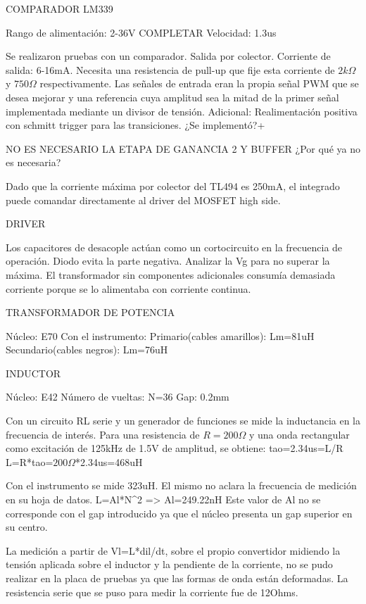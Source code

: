 COMPARADOR LM339

Rango de alimentación: 2-36V
COMPLETAR
Velocidad: 1.3us

Se realizaron pruebas con un comparador. 
Salida por colector. Corriente de salida: 6-16mA. Necesita una resistencia de pull-up que fije esta corriente de $2k\Omega$ y $750\Omega$ respectivamente. 
Las señales de entrada eran la propia señal PWM que se desea mejorar y una referencia cuya amplitud 
sea la mitad de la primer señal implementada mediante un divisor de tensión. 
Adicional: Realimentación positiva con schmitt trigger para las transiciones. ¿Se implementó?+

NO ES NECESARIO LA ETAPA DE GANANCIA 2 Y BUFFER ¿Por qué ya no es necesaria?

Dado que la corriente máxima por colector del TL494 es 250mA, el integrado puede comandar directamente al driver del MOSFET high side. 

DRIVER

Los capacitores de desacople actúan como un cortocircuito en la frecuencia de operación. 
Diodo evita la parte negativa. 
Analizar la Vg para no superar la máxima. 
El transformador sin componentes adicionales consumía demasiada corriente porque se lo alimentaba con corriente continua. 

TRANSFORMADOR DE POTENCIA

Núcleo: E70
Con el instrumento:
Primario(cables amarillos): Lm=81uH
Secundario(cables negros): Lm=76uH

INDUCTOR

Núcleo: E42
Número de vueltas: N=36
Gap: 0.2mm

Con un circuito RL serie y un generador de funciones se mide la inductancia en la frecuencia de interés.
Para una resistencia de $R=200\Omega$ y una onda rectangular como excitación de 125kHz de 1.5V de amplitud, se obtiene:
tao=2.34us=L/R
L=R*tao=$200\Omega$*2.34us=468uH

Con el instrumento se mide 323uH. El mismo no aclara la frecuencia de medición en su hoja de datos. 
L=Al*N^2 => Al=249.22nH
Este valor de Al no se corresponde con el gap introducido ya que el núcleo presenta un gap superior en su centro. 

La medición a partir de Vl=L*dil/dt, sobre el propio convertidor midiendo la tensión aplicada sobre el inductor y la pendiente de la corriente, 
no se pudo realizar en la placa de pruebas ya que las formas de onda están deformadas. 
La resistencia serie que se puso para medir la corriente fue de 12Ohms. 

